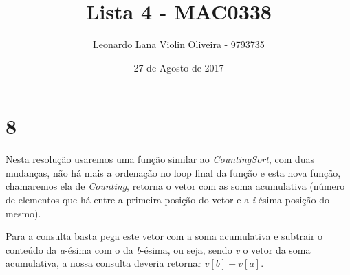 \documentclass[a4paper, 12pt]{article}
\title{Lista 4 - MAC0338}
\author{Leonardo Lana Violin Oliveira - 9793735}
\date{27 de Agosto de 2017}
\begin{document}
\maketitle
\section*{8}

Nesta resolução usaremos uma função similar ao \textit{CountingSort}, com duas
mudanças, não há mais a ordenação no loop final da função e esta nova função,
chamaremos ela de \textit{Counting}, retorna o vetor com as soma acumulativa
(número de elementos que há entre a primeira posição do vetor e a
\textit{i}-ésima posição do mesmo).

Para a consulta basta pega este vetor com a soma acumulativa e subtrair o
conteúdo da \textit{a}-ésima com o da \textit{b}-ésima, ou seja, sendo
\textit{v} o vetor da soma acumulativa, a nossa consulta deveria retornar
$v[b] - v[a]$.
\end{document}
